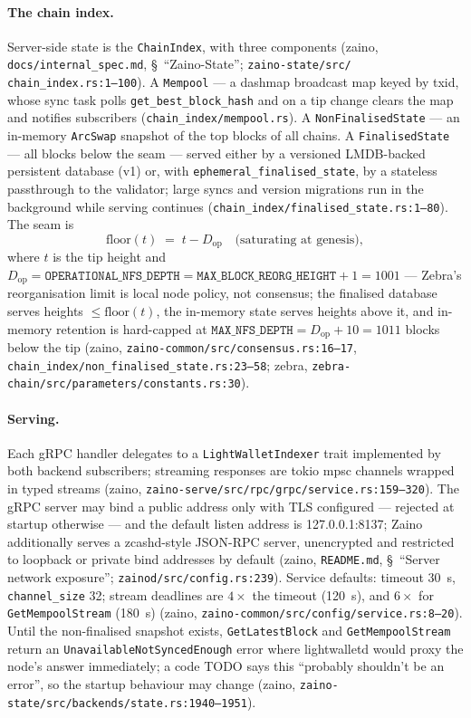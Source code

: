 \documentclass[11pt,a4paper]{article}
\theoremstyle{definition}
\begin{document}
\paragraph{The chain index.} Server-side state is the
\texttt{ChainIndex}, with three components (\textsf{zaino},
\texttt{docs/internal\_spec.md}, \S~``Zaino-State'';
\texttt{zaino-state/}\allowbreak\texttt{src/}\allowbreak
\texttt{chain\_index.rs:1--100}). A \texttt{Mempool}
--- a dashmap broadcast map keyed by txid, whose sync task polls
\texttt{get\_best\_block\_hash} and on a tip change clears the map and
notifies subscribers (\texttt{chain\_index/mempool.rs}). A
\texttt{NonFinalisedState} --- an in-memory \texttt{ArcSwap} snapshot of
the top blocks of all chains. A \texttt{FinalisedState} --- all blocks
below the seam --- served either by a versioned LMDB-backed persistent
database (v1) or, with \texttt{ephemeral\_finalised\_state}, by a
stateless passthrough to the validator; large syncs and version
migrations run in the background while serving continues
(\texttt{chain\_index/finalised\_state.rs:1--80}). The seam is
\[
\mathrm{floor}(t) \;=\; t - D_{\mathrm{op}}
\quad\text{(saturating at genesis)},
\]
where $t$ is the tip height and
$D_{\mathrm{op}} = \mathtt{OPERATIONAL\_NFS\_DEPTH} =
\mathtt{MAX\_BLOCK\_REORG\_HEIGHT} + 1 = 1001$ --- Zebra's reorganisation
limit is local node policy, not consensus; the finalised database serves
heights $\le \mathrm{floor}(t)$, the in-memory state serves heights above
it, and in-memory retention is hard-capped at
$\mathtt{MAX\_NFS\_DEPTH} = D_{\mathrm{op}} + 10 = 1011$ blocks below the
tip (\textsf{zaino}, \texttt{zaino-common/src/consensus.rs:16--17},
\texttt{chain\_index/non\_finalised\_state.rs:23--58}; \textsf{zebra},
\texttt{zebra-chain/src/parameters/constants.rs:30}).

\paragraph{Serving.} Each gRPC handler delegates to a
\texttt{LightWalletIndexer} trait implemented by both backend
subscribers; streaming responses are tokio mpsc channels wrapped in typed
streams (\textsf{zaino},
\texttt{zaino-serve/src/rpc/grpc/service.rs:159--320}). The gRPC server
may bind a public address only with TLS configured --- rejected at
startup otherwise --- and the default listen address is 127.0.0.1:8137;
Zaino additionally serves a zcashd-style JSON-RPC server, unencrypted and
restricted to loopback or private bind addresses by default
(\textsf{zaino}, \texttt{README.md}, \S~``Server network exposure'';
\texttt{zainod/src/config.rs:239}). Service defaults: timeout 30~s,
\texttt{channel\_size} 32; stream deadlines are $4\times$ the timeout
(120~s), and $6\times$ for \texttt{GetMempoolStream} (180~s)
(\textsf{zaino}, \texttt{zaino-common/src/config/service.rs:8--20}).
Until the non-finalised snapshot exists, \texttt{GetLatestBlock} and
\texttt{GetMempoolStream} return an \texttt{UnavailableNotSyncedEnough}
error where lightwalletd would proxy the node's answer immediately; a
code TODO says this ``probably shouldn't be an error'', so the startup
behaviour may change (\textsf{zaino},
\texttt{zaino-state/src/backends/state.rs:1940--1951}).
\end{document}
